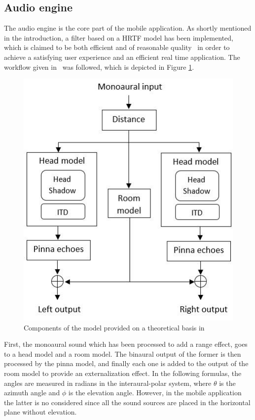 \documentclass[journal]{IEEEtran}
\begin{document}
\subsection{Audio engine}
The audio engine is the core part of the mobile application. As shortly mentioned in the introduction, a filter based on a HRTF model has been implemented, which is claimed to be both efficient and of reasonable quality~\cite{Brown1997} in order to achieve a satisfying user experience and an efficient real time application. The workflow given in~\cite{Brown1997} was followed, which is depicted in Figure \ref{fig:workflow}. 

\begin{figure}[h!]
  \centering
    \includegraphics[scale=0.55]{graphics/graphic.jpg}
  \caption{Components of the model provided on a theoretical basis in~\cite{Brown1997}}
  \label{fig:workflow}
\end{figure}

First, the monoaural sound which has been processed to add a range effect, goes to a head model and a room model. The binaural output of the former is then processed by the pinna model, and finally each one is added to the output of the room model to provide an externalization effect. In the following formulas, the angles are measured in radians in the interaural-polar system, where $\theta$ is the azimuth angle and $\phi$ is the elevation angle. However, in the mobile application the latter is no considered since all the sound sources are placed in the horizontal plane without elevation. \\
\end{document}

